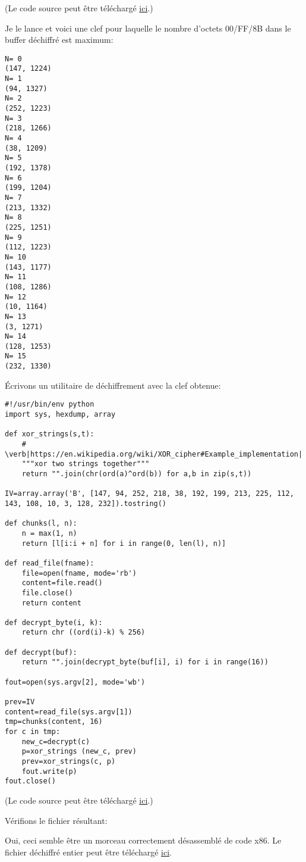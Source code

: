 (Le code source peut être téléchargé
\href{\RepoURL/examples/simple_exec_crypto/files/decrypt.py}{ici}.)

Je le lance et voici une clef pour laquelle le nombre d'octets 00/FF/8B dans le buffer
déchiffré est maximum:

\begin{lstlisting}
N= 0
(147, 1224)
N= 1
(94, 1327)
N= 2
(252, 1223)
N= 3
(218, 1266)
N= 4
(38, 1209)
N= 5
(192, 1378)
N= 6
(199, 1204)
N= 7
(213, 1332)
N= 8
(225, 1251)
N= 9
(112, 1223)
N= 10
(143, 1177)
N= 11
(108, 1286)
N= 12
(10, 1164)
N= 13
(3, 1271)
N= 14
(128, 1253)
N= 15
(232, 1330)
\end{lstlisting}

Écrivons un utilitaire de déchiffrement avec la clef obtenue:

\begin{lstlisting}[style=custompy]
#!/usr/bin/env python
import sys, hexdump, array

def xor_strings(s,t):
    # \verb|https://en.wikipedia.org/wiki/XOR_cipher#Example_implementation|
    """xor two strings together"""
    return "".join(chr(ord(a)^ord(b)) for a,b in zip(s,t))

IV=array.array('B', [147, 94, 252, 218, 38, 192, 199, 213, 225, 112, 143, 108, 10, 3, 128, 232]).tostring()

def chunks(l, n):
    n = max(1, n)
    return [l[i:i + n] for i in range(0, len(l), n)]

def read_file(fname):
    file=open(fname, mode='rb')
    content=file.read()
    file.close()
    return content

def decrypt_byte(i, k):
    return chr ((ord(i)-k) % 256)

def decrypt(buf):
    return "".join(decrypt_byte(buf[i], i) for i in range(16))

fout=open(sys.argv[2], mode='wb')

prev=IV
content=read_file(sys.argv[1])
tmp=chunks(content, 16)
for c in tmp:
    new_c=decrypt(c)
    p=xor_strings (new_c, prev)
    prev=xor_strings(c, p)
    fout.write(p)
fout.close()
\end{lstlisting}

(Le code source peut être téléchargé
\href{\RepoURL/examples/simple_exec_crypto/files/decrypt2.py}
{ici}.)

Vérifions le fichier résultant:



Oui, ceci semble être un morceau correctement désassemblé de code x86.
Le fichier déchiffré entier peut être téléchargé
\href{\RepoURL/examples/simple_exec_crypto/files/decrypted.bin}{ici}.

